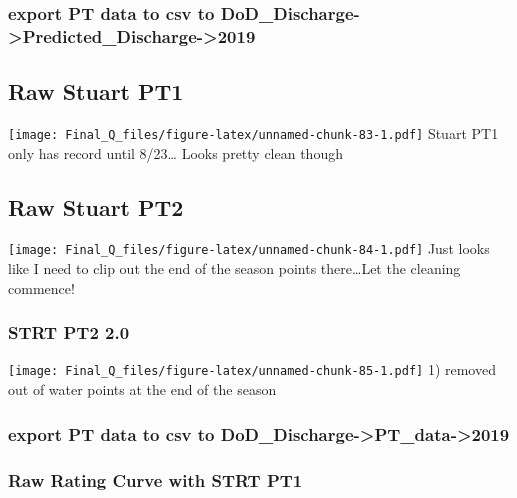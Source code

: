 \documentclass[
]{article}
\begin{document}
\hypertarget{export-pt-data-to-csv-to-dod_discharge-predicted_discharge-2019-3}{%
\subsubsection{export PT data to csv to
DoD\_Discharge-\textgreater Predicted\_Discharge-\textgreater2019}\label{export-pt-data-to-csv-to-dod_discharge-predicted_discharge-2019-3}}

\hypertarget{raw-stuart-pt1}{%
\subsection{Raw Stuart PT1}\label{raw-stuart-pt1}}

\texttt{[image: Final\_Q\_files/figure-latex/unnamed-chunk-83-1.pdf]}
Stuart PT1 only has record until 8/23\ldots{} Looks pretty clean though

\hypertarget{raw-stuart-pt2}{%
\subsection{Raw Stuart PT2}\label{raw-stuart-pt2}}

\texttt{[image: Final\_Q\_files/figure-latex/unnamed-chunk-84-1.pdf]} Just
looks like I need to clip out the end of the season points
there\ldots Let the cleaning commence!

\hypertarget{strt-pt2-2.0}{%
\subsubsection{STRT PT2 2.0}\label{strt-pt2-2.0}}

\texttt{[image: Final\_Q\_files/figure-latex/unnamed-chunk-85-1.pdf]} 1)
removed out of water points at the end of the season

\hypertarget{export-pt-data-to-csv-to-dod_discharge-pt_data-2019-4}{%
\subsubsection{export PT data to csv to
DoD\_Discharge-\textgreater PT\_data-\textgreater2019}\label{export-pt-data-to-csv-to-dod_discharge-pt_data-2019-4}}

\hypertarget{raw-rating-curve-with-strt-pt1}{%
\subsubsection{Raw Rating Curve with STRT
PT1}\label{raw-rating-curve-with-strt-pt1}}
\end{document}
